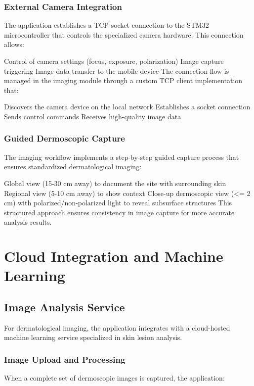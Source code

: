 \subsubsection{External Camera Integration}

The application establishes a TCP socket connection to the STM32 microcontroller that controls the specialized camera hardware. This connection allows:

Control of camera settings (focus, exposure, polarization)
Image capture triggering
Image data transfer to the mobile device
The connection flow is managed in the imaging module through a custom TCP client implementation that:

Discovers the camera device on the local network
Establishes a socket connection
Sends control commands
Receives high-quality image data
\subsubsection{Guided Dermoscopic Capture}

The imaging workflow implements a step-by-step guided capture process that ensures standardized dermatological imaging:

Global view (15-30 cm away) to document the site with surrounding skin
Regional view (5-10 cm away) to show context
Close-up dermoscopic view (<= 2 cm) with polarized/non-polarized light to reveal subsurface structures
This structured approach ensures consistency in image capture for more accurate analysis results.

\section{Cloud Integration and Machine Learning}

\subsection{Image Analysis Service}

For dermatological imaging, the application integrates with a cloud-hosted machine learning service specialized in skin lesion analysis.

\subsubsection{Image Upload and Processing}

When a complete set of dermoscopic images is captured, the application:

